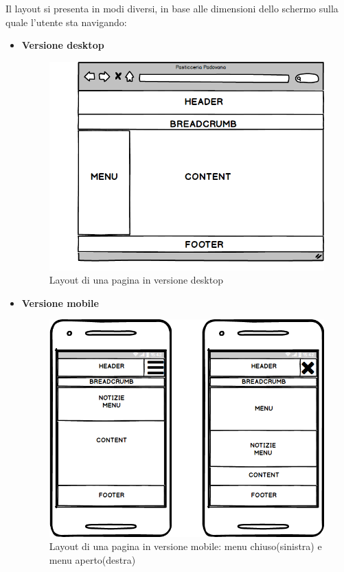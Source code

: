\newpage
Il layout si presenta in modi diversi, in base alle dimensioni dello schermo sulla quale l'utente sta navigando:\\
\begin{itemize}
	\item
	\textbf{Versione desktop}\\ 
	\begin{figure}[!h]
		\centering
		\includegraphics[width=0.7\linewidth]{sezioni/Progettazione/Immagini/desktop_layout.png}
	    \caption{Layout di una pagina in versione desktop}
		\label{Fig:verDesktop}
	\end{figure}
	\item	  
	\textbf{Versione mobile}	
	\begin{figure}[!h]				  
		\centering
		\includegraphics[width=0.7\linewidth]{sezioni/Progettazione/Immagini/mobile_layout.png}
	    \caption{Layout di una pagina in versione mobile: menu chiuso(sinistra) e menu aperto(destra)}
	    \label{Fig:verMobile}
	\end{figure}	  
\end{itemize}
\newpage	
